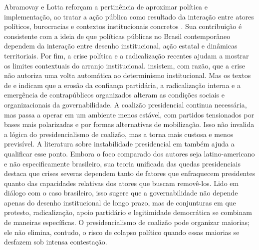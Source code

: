 \documentclass[12pt,a4paper]{article}
\begin{document}
Abramovay e Lotta reforçam a pertinência de aproximar política e implementação, ao tratar a ação pública como resultado da interação entre atores políticos, burocracias e contextos institucionais concretos \parencite{abramovay2022_abramovay_lotta}. Sua contribuição é consistente com a ideia de que políticas públicas no Brasil contemporâneo dependem da interação entre desenho institucional, ação estatal e dinâmicas territoriais.
Por fim, a crise política e a radicalização recentes ajudam a mostrar os limites contextuais do arranjo institucional. \textcite{limongi2017_a_crise} insistem, com razão, que a crise não autoriza uma volta automática ao determinismo institucional. Mas os textos de \textcite{alves2024_rage_within} e \textcite{rocha2019_imposto_e} indicam que a erosão da confiança partidária, a radicalização interna e a emergência de contrapúblicos organizados alteram as condições sociais e organizacionais da governabilidade. A coalizão presidencial continua necessária, mas passa a operar em um ambiente menos estável, com partidos tensionados por bases mais polarizadas e por formas alternativas de mobilização. Isso não invalida a lógica do presidencialismo de coalizão, mas a torna mais custosa e menos previsível.
A literatura sobre instabilidade presidencial em \textcite{perez_lian2016_explaining_military} também ajuda a qualificar esse ponto. Embora o foco comparado dos autores seja latino-americano e não especificamente brasileiro, sua teoria unificada das quedas presidenciais destaca que crises severas dependem tanto de fatores que enfraquecem presidentes quanto das capacidades relativas dos atores que buscam removê-los. Lido em diálogo com o caso brasileiro, isso sugere que a governabilidade não depende apenas do desenho institucional de longo prazo, mas de conjunturas em que protesto, radicalização, apoio partidário e legitimidade democrática se combinam de maneiras específicas. O presidencialismo de coalizão pode organizar maiorias; ele não elimina, contudo, o risco de colapso político quando essas maiorias se desfazem sob intensa contestação.
\end{document}
